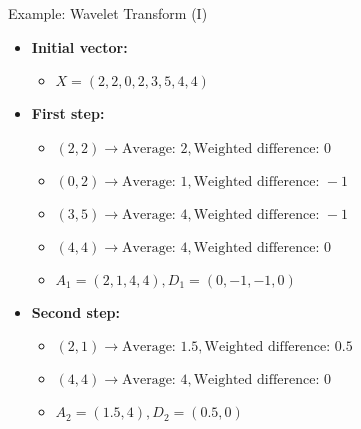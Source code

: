 \begin{frame}{Example: Wavelet Transform (I)}
	\begin{itemize}
		\item \textbf{Initial vector:}
		      \begin{itemize}
			      \item $X = (2,2,0,2,3,5,4,4)$
		      \end{itemize}
		\item \textbf{First step:}
		      \begin{itemize}
			      \item $(2,2) \rightarrow \text{Average: } 2, \text{Weighted
					            difference: } 0$
			      \item $(0,2) \rightarrow \text{Average: } 1, \text{Weighted
					            difference: } -1$
			      \item $(3,5) \rightarrow \text{Average: } 4, \text{Weighted
					            difference: } -1$
			      \item $(4,4) \rightarrow \text{Average: } 4, \text{Weighted
					            difference: } 0$
			      \item $A_1=(2,1,4,4), D_1=(0,-1,-1,0)$
		      \end{itemize}
		\item \textbf{Second step:}
		      \begin{itemize}
			      \item $(2,1) \rightarrow \text{Average: } 1.5, \text{Weighted
					            difference: } 0.5$
			      \item $(4,4) \rightarrow \text{Average: } 4, \text{Weighted
					            difference: } 0$
			      \item $A_2=(1.5,4), D_2=(0.5,0)$
		      \end{itemize}
	\end{itemize}
\end{frame}

